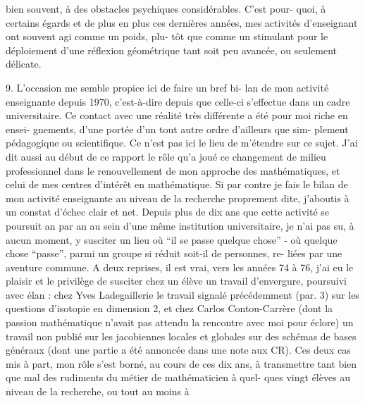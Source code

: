
bien souvent, à des obstacles psychiques considérables. C'est pour-%
quoi, à certains égards et de plus en plus ces dernières années,
mes activités d'enseignant ont souvent agi comme un poids, plu-%
tôt que comme un stimulant pour le déploiement d'une réflexion
géométrique tant soit peu avancée, ou seulement délicate.

9. L'occasion me semble propice ici de faire un bref bi-%
lan de mon activité enseignante depuis 1970, c'est-à-dire depuis
que celle-ci s'effectue dans un cadre universitaire. Ce contact
avec une réalité très différente a été pour moi riche en ensei-%
gnements, d'une portée d'un tout autre ordre d'ailleurs que sim-%
plement pédagogique ou scientifique. Ce n'est pas ici le lieu de
m'étendre sur ce sujet. J'ai dit aussi au début de ce rapport le
rôle qu'a joué ce changement de milieu professionnel dans le
renouvellement de mon approche des mathématiques, et celui de mes
centres d'intérêt en mathématique. Si par contre je fais le bilan
de mon activité enseignante au niveau de la recherche proprement
dite, j'aboutis à un constat d'échec clair et net. Depuis plus
de dix ans que cette activité se poursuit an par an au sein d'une
même institution universitaire, je n'ai pas su, à aucun moment,
y susciter un lieu où ``il se passe quelque chose'' - où quelque
chose ``passe'', parmi un groupe si réduit soit-il de personnes, re-%
liées par une aventure commune. A deux reprises, il est vrai, vers
les années 74 à 76, j'ai eu le plaisir et le privilège de susciter
chez un élève un travail d'envergure, poursuivi avec élan : chez
Yves Ladegaillerie le travail signalé précédemment (par. 3) sur
les questions d'isotopie en dimension 2, et chez Carlos Contou-Carrère
(dont la passion mathématique n'avait pas attendu la rencontre
avec moi pour éclore) un travail non publié sur les jacobiennes
locales et globales sur des schémas de bases généraux (dont une
partie a été annoncée dans une note aux CR). Ces deux cas mis à
part, mon rôle s'est borné, au cours de ces dix ans, à transmettre
tant bien que mal des rudiments du métier de mathématicien à quel-%
ques vingt élèves au niveau de la recherche, ou tout au moins à

